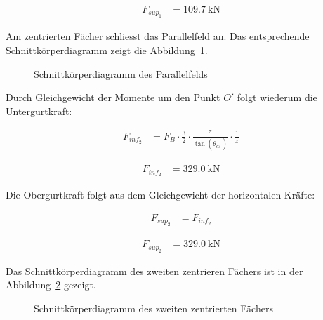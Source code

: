 \documentclass[
  11pt,
  letterpaper,
]{scrreprt}
\begin{document}
$$
\begin{aligned}
F_{sup_{1}} &= 109.7\ \mathrm{kN} \; 
\end{aligned}
$$

Am zentrierten Fächer schliesst das Parallelfeld an. Das entsprechende
Schnittkörperdiagramm zeigt die
Abbildung~\ref{fig-skd_2_spannungsfelder_sv14}.

\begin{figure}[H]


\caption{\label{fig-skd_2_spannungsfelder_sv14}Schnittkörperdiagramm des
Parallelfelds}

\end{figure}%

Durch Gleichgewicht der Momente um den Punkt \(O'\) folgt wiederum die
Untergurtkraft:

$$
\begin{aligned}
F_{inf_{2}} &= F_{B} \cdot \frac{ 3 }{ 2 } \cdot \frac{ z_{_{}} }{ \tan \left( \theta_{c3_{_{}}} \right) } \cdot \frac{1} { z_{_{}} } \; 
\end{aligned}
$$

$$
\begin{aligned}
F_{inf_{2}} &= 329.0\ \mathrm{kN} \;
\end{aligned}
$$

Die Obergurtkraft folgt aus dem Gleichgewicht der horizontalen Kräfte:

$$
\begin{aligned}
F_{sup_{2}} &= F_{inf_{2}} \; 
\end{aligned}
$$

$$
\begin{aligned}
F_{sup_{2}} &= 329.0\ \mathrm{kN} \; 
\end{aligned}
$$

Das Schnittkörperdiagramm des zweiten zentrieren Fächers ist in der
Abbildung~\ref{fig-skd_3_spannungsfelder_sv14} gezeigt.

\begin{figure}[H]


\caption{\label{fig-skd_3_spannungsfelder_sv14}Schnittkörperdiagramm des
zweiten zentrierten Fächers}

\end{figure}%
\end{document}
